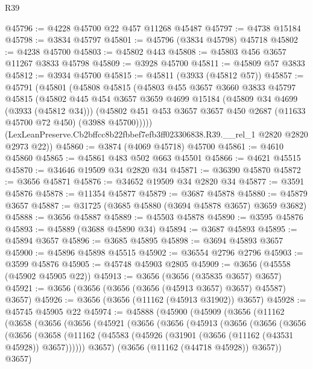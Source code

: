 \begin{lexlean}{R39}
\begin{coremodule}
@45796 := @4228 @45700 @22 @457 @11268 @45487
@45797 := @4738 @15184
@45798 := @3834 @45797
@45801 := @45796 (@3834 @45798) @45718
@45802 := @4238 @45700
@45803 := @45802 @443
@45808 := @45803 @456 @3657 @11267 @3833 @45798
@45809 := @3928 @45700
@45811 := @45809 @57 @3833
@45812 := @3934 @45700
@45815 := @45811 (@3933 (@45812 @57))
@45857 := @45791
    (@45801
      (@45808
        @45815
        (@45803
          @455
          @3657
          @3660
          @3833
          @45797
          @45815
          (@45802
            @445
            @454
            @3657
            @3659
            @4699
            @15184
            (@45809 @34 @4699 (@3933 (@45812 @34)))
            (@45802 @451 @453 @3657 @3657 @450 @2687 (@11633 @45700 @72 @450) (@3988 @45700)))))
      (LexLeanPreserve.Cb2bffcc8b22fbbef7efb3ff023306838.R39.__rel_1 @2820 @2820 @2973 @22))
@45860 := @3874 (@4069 @45718) @45700
@45861 := @4610 @45860
@45865 := @45861 @483 @502 @663 @45501
@45866 := @4621 @45515
@45870 := @34646 @19509 @34 @2820 @34
@45871 := @36390 @45870
@45872 := @3656 @45871
@45876 := @34652 @19509 @34 @2820 @34
@45877 := @3591 @45876
@45878 := @11354 @45877
@45879 := @3687 @45878
@45880 := @45879 @3657
@45887 := @31725 (@3685 @45880 (@3694 @45878 @3657) @3659 @3682)
@45888 := @3656 @45887
@45889 := @45503 @45878
@45890 := @3595 @45876
@45893 := @45889 (@3688 @45890 @34)
@45894 := @3687 @45893
@45895 := @45894 @3657
@45896 := @3685 @45895
@45898 := @3694 @45893 @3657
@45900 := @45896 @45898 @45515
@45902 := @36554 @2796 @2796
@45903 := @3599 @45876
@45905 := @45748 @45903 @2805
@45909 := @3656 (@45558 (@45902 @45905 @22))
@45913 := @3656 (@3656 (@35835 @3657) @3657)
@45921 := @3656 (@3656 (@3656 (@3656 (@45913 @3657) @3657) @45587) @3657)
@45926 := @3656 (@3656 (@11162 (@45913 @31902)) @3657)
@45928 := @45745 @45905 @22
@45974 := @45888
    (@45900
      (@45909
        (@3656
          (@11162
            (@3658
              (@3656
                (@3656
                  (@45921
                    (@3656
                      (@3656
                        (@45913
                          (@3656
                            (@3656
                              (@3656
                                (@3656
                                  (@3658
                                    (@11162
                                      (@45583
                                        (@45926 (@31901 (@3656 (@11162 (@43531 @45928)) @3657))))))
                                  @3657)
                                (@3656 (@11162 (@44718 @45928)) @3657))
                              @3657)

\end{coremodule}
\end{lexlean}
